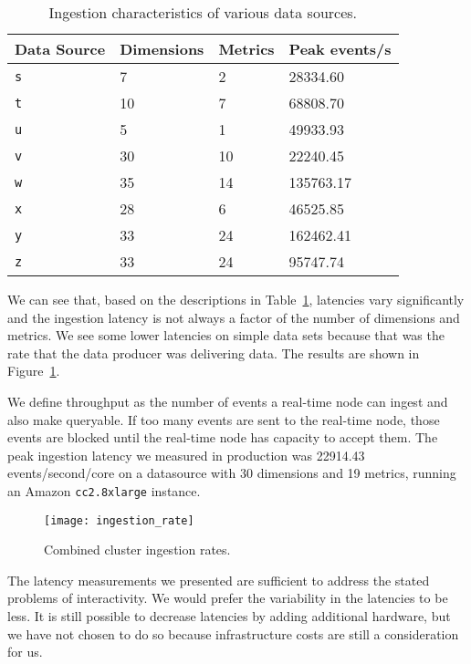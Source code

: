 \documentclass{sig-alternate-2013}
\begin{document}
\begin{table}
  \centering
  \begin{tabular}{| l | l | l | l |}
    \hline
    \scriptsize\textbf{Data Source} & \scriptsize\textbf{Dimensions} & \scriptsize\textbf{Metrics} & \scriptsize\textbf{Peak events/s} \\ \hline
    \texttt{s} & 7 & 2 & 28334.60 \\ \hline
    \texttt{t} & 10 & 7 & 68808.70 \\ \hline
    \texttt{u} & 5 & 1 & 49933.93 \\ \hline
    \texttt{v} & 30 & 10 & 22240.45 \\ \hline
    \texttt{w} & 35 & 14 & 135763.17 \\ \hline
    \texttt{x} & 28 & 6 & 46525.85 \\ \hline
    \texttt{y} & 33 & 24 & 162462.41 \\ \hline
    \texttt{z} & 33 & 24 & 95747.74 \\ \hline
  \end{tabular}
  \caption{Ingestion characteristics of various data sources.}
  \label{tab:ingest_datasources}
\end{table}

We can see that, based on the descriptions in
Table~\ref{tab:ingest_datasources}, latencies vary significantly and the
ingestion latency is not always a factor of the number of dimensions and
metrics. We see some lower latencies on simple data sets because that was the
rate that the data producer was delivering data. The results are shown in
Figure~\ref{fig:ingestion_rate}.

We define throughput as the number of events a
real-time node can ingest and also make queryable. If too many events are sent
to the real-time node, those events are blocked until the real-time node has
capacity to accept them. The peak ingestion latency we measured in production
was 22914.43 events/second/core on a datasource with 30 dimensions and 19 metrics,
running an Amazon \texttt{cc2.8xlarge} instance.

\begin{figure}
\centering
\texttt{[image: ingestion\_rate]}
\caption{Combined cluster ingestion rates.}
\label{fig:ingestion_rate}
\end{figure}

The latency measurements we presented are sufficient to address the stated
problems of interactivity. We would prefer the variability in the latencies to
be less. It is still possible to decrease latencies by adding
additional hardware, but we have not chosen to do so because infrastructure
costs are still a consideration for us.
\end{document}
